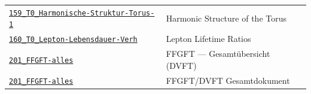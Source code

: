 {\begin{longtable}{@{}>{\raggedright\arraybackslash}p{} >{\raggedright\arraybackslash}p{}@{}}
\href{https://github.com/jpascher/T0-Time-Mass-Duality/blob/main/2/pdf/159_T0_Harmonische-Struktur-Torus-1_En.pdf}{\texttt{159\_T0\_Harmonische-Struktur-Torus-1}} & Harmonic Structure of the Torus \\
\href{https://github.com/jpascher/T0-Time-Mass-Duality/blob/main/2/pdf/160_T0_Lepton-Lebensdauer-Verh_En.pdf}{\texttt{160\_T0\_Lepton-Lebensdauer-Verh}} & Lepton Lifetime Ratios \\
\href{https://github.com/jpascher/T0-Time-Mass-Duality/blob/main/2/pdf/201_FFGFT-alles_En.pdf}{\texttt{201\_FFGFT-alles}} & FFGFT — Gesamtübersicht (DVFT) \\
\href{https://github.com/jpascher/T0-Time-Mass-Duality/blob/main/2/pdf/201_FFGFT-alles_De.pdf}{\texttt{201\_FFGFT-alles}} & FFGFT/DVFT Gesamtdokument \\
\end{longtable}
}